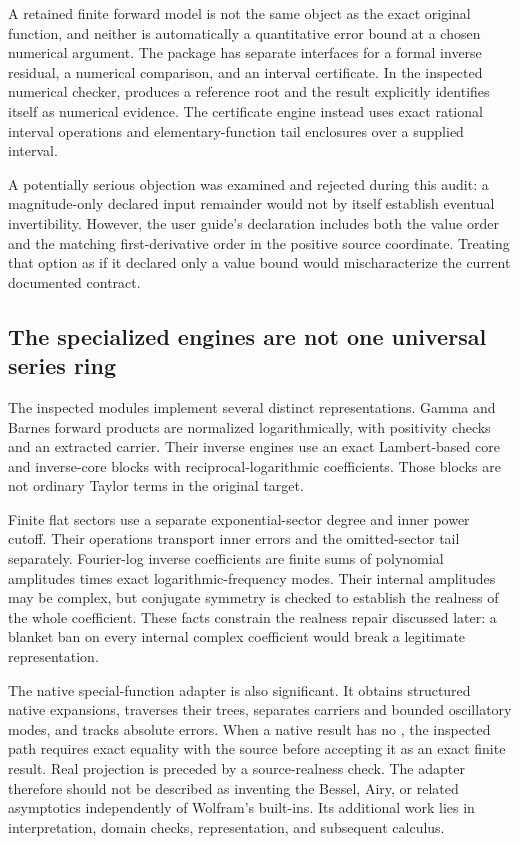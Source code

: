 \documentclass[11pt,letterpaper]{article}
\newcommand{\code}[1]{\texttt{\detokenize{#1}}}
\begin{document}
A retained finite forward model is not the same object as the exact original function, and neither is automatically a quantitative error bound at a chosen numerical argument. The package has separate interfaces for a formal inverse residual, a numerical comparison, and an interval certificate. In the inspected numerical checker, \code{FindRoot} produces a reference root and the result explicitly identifies itself as numerical evidence. The certificate engine instead uses exact rational interval operations and elementary-function tail enclosures over a supplied interval.\cite{repo-core,repo-numerical,repo-certificates}

A potentially serious objection was examined and rejected during this audit: a magnitude-only declared input remainder would not by itself establish eventual invertibility. However, the user guide's \code{"InputRemainder" -> {rho,k}} declaration includes both the value order and the matching first-derivative order in the positive source coordinate. Treating that option as if it declared only a value bound would mischaracterize the current documented contract.\cite{repo-guide}

\subsection{The specialized engines are not one universal series ring}
The inspected modules implement several distinct representations. Gamma and Barnes forward products are normalized logarithmically, with positivity checks and an extracted carrier. Their inverse engines use an exact Lambert-based core and inverse-core blocks with reciprocal-logarithmic coefficients. Those blocks are not ordinary Taylor terms in the original target.\cite{repo-gamma,repo-gammaops,repo-readme}

Finite flat sectors use a separate exponential-sector degree and inner power cutoff. Their operations transport inner errors and the omitted-sector tail separately. Fourier-log inverse coefficients are finite sums of polynomial amplitudes times exact logarithmic-frequency modes. Their internal amplitudes may be complex, but conjugate symmetry is checked to establish the realness of the whole coefficient. These facts constrain the realness repair discussed later: a blanket ban on every internal complex coefficient would break a legitimate representation.\cite{repo-flat,repo-fourier}

The native special-function adapter is also significant. It obtains structured native expansions, traverses their \code{SeriesData} trees, separates carriers and bounded oscillatory modes, and tracks absolute errors. When a native result has no \code{SeriesData}, the inspected path requires exact equality with the source before accepting it as an exact finite result. Real projection is preceded by a source-realness check. The adapter therefore should not be described as inventing the Bessel, Airy, or related asymptotics independently of Wolfram's built-ins. Its additional work lies in interpretation, domain checks, representation, and subsequent calculus.\cite{repo-native,repo-parameterized}
\end{document}
